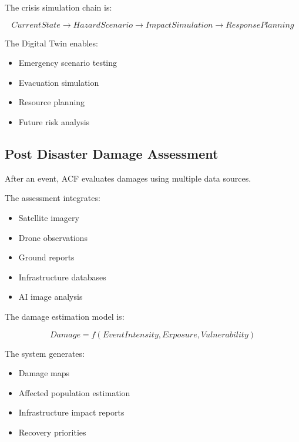 The crisis simulation chain is:

\[
CurrentState
\rightarrow
HazardScenario
\rightarrow
ImpactSimulation
\rightarrow
ResponsePlanning
\]


The Digital Twin enables:

\begin{itemize}

\item Emergency scenario testing

\item Evacuation simulation

\item Resource planning

\item Future risk analysis

\end{itemize}



\subsection{Post Disaster Damage Assessment}

After an event, ACF evaluates damages using multiple data sources.

The assessment integrates:

\begin{itemize}

\item Satellite imagery

\item Drone observations

\item Ground reports

\item Infrastructure databases

\item AI image analysis

\end{itemize}


The damage estimation model is:

\[
Damage=
f(EventIntensity,Exposure,Vulnerability)
\]


The system generates:

\begin{itemize}

\item Damage maps

\item Affected population estimation

\item Infrastructure impact reports

\item Recovery priorities

\end{itemize}


